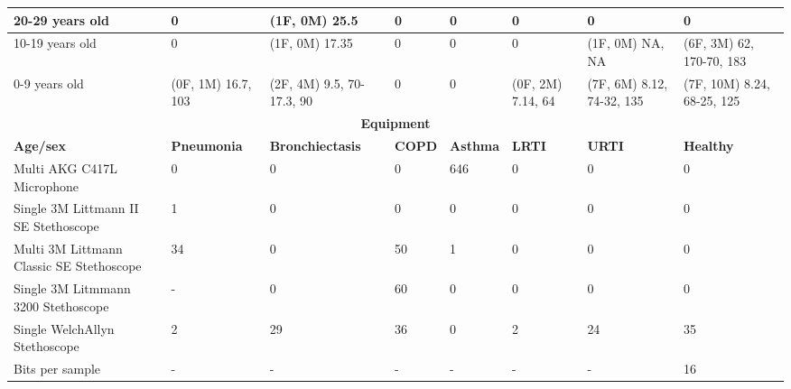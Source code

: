 \begin{table}[h]
\begin{tabular}{|p{1.8cm}|p{1.8cm}|p{2cm}|p{1.8cm}|p{1.8cm}|p{1.8cm}|p{1.8cm}|p{1.8cm}|}
        \hline
        20-29 years old & 0 & (1F, 0M) 25.5 & 0 & 0 & 0 & 0 & 0 \\
        \hline
        10-19 years old & 0 & (1F, 0M) 17.35 & 0 & 0 & 0 & (1F, 0M) NA, NA & (6F, 3M) 62, 170-70, 183 \\
        \hline
        0-9 years old & (0F, 1M) 16.7, 103 & (2F, 4M) 9.5, 70-17.3, 90 & 0 & 0 & (0F, 2M) 7.14, 64 & (7F, 6M) 8.12, 74-32, 135 & (7F, 10M) 8.24, 68-25, 125 \\
        \hline
        \multicolumn{8}{|c|}{\textbf{Equipment}} \\
        \hline
        \textbf{Age/sex} & \textbf{Pneumonia} & \textbf{Bronchiectasis} & \textbf{COPD} & \textbf{Asthma} & \textbf{LRTI} & \textbf{URTI} & \textbf{Healthy} \\
        \hline
        Multi AKG C417L Microphone & 0 & 0 & 0 & 646 & 0 & 0 & 0 \\
        \hline
        Single 3M Littmann II SE Stethoscope & 1 & 0 & 0 & 0 & 0 & 0 & 0 \\
        \hline
        Multi 3M Littmann Classic SE Stethoscope & 34 & 0 & 50 & 1 & 0 & 0 & 0 \\
        \hline
        Single 3M Litmmann 3200 Stethoscope & - & 0 & 60 & 0 & 0 & 0 & 0 \\
        \hline
        Single WelchAllyn Stethoscope & 2 & 29 & 36 & 0 & 2 & 24 & 35 \\
        \hline
        Bits per sample & - & - & - & - & - & - & 16 \\
        \hline
    \end{tabular}
\label{tab3}
\end{table}
